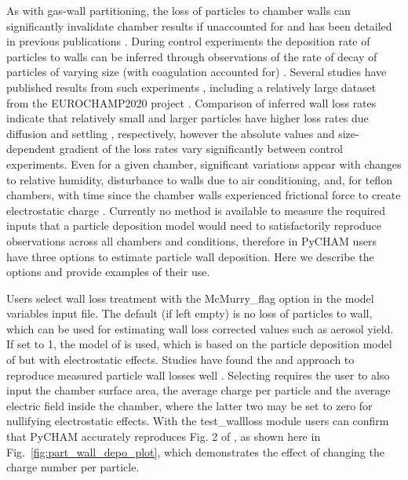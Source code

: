 \documentclass[gmd, manuscript]{copernicus}
\begin{document}
As with gas-wall partitioning, the loss of particles to chamber walls can significantly invalidate chamber results if unaccounted for and has been detailed in previous publications \citep{Crump1981, McMurry1985, Nah2017, Wang2018}.  During control experiments the deposition rate of particles to walls can be inferred through observations of the rate of decay of particles of varying size (with coagulation accounted for) \citep{Charan2019}.  Several studies have published results from such experiments \citep{McMurry1985, Wang2018}, including a relatively large dataset from the EUROCHAMP2020 project \citep{EUROCHAMP2020}.  Comparison of inferred wall loss rates indicate that relatively small and larger particles have higher loss rates due diffusion and settling \citep{Crump1981}, respectively, however the absolute values and size-dependent gradient of the loss rates vary significantly between control experiments.  Even for a given chamber, significant variations appear with changes to relative humidity, disturbance to walls due to air conditioning, and, for teflon chambers, with time since the chamber walls experienced frictional force to create electrostatic charge \citep{Wang2018}.  Currently no method is available to measure the required inputs that a particle deposition model would need to satisfactorily reproduce observations across all chambers and conditions, therefore in PyCHAM users have three options to estimate particle wall deposition.  Here we describe the options and provide examples of their use.

Users select wall loss treatment with the McMurry\_flag option in the model variables input file.  The default (if left empty) is no loss of particles to wall, which can be used for estimating wall loss corrected values such as aerosol yield.  If set to 1, the model of \citet{McMurry1985} is used, which is based on the particle deposition model of \citet{Crump1981} but with electrostatic effects.  Studies have found the \citet{Crump1981} and \citet{McMurry1985} approach to reproduce measured particle wall losses well \citep{Chen1992, Kim2001}.  Selecting \citet{McMurry1985} requires the user to also input the chamber surface area, the average charge per particle and the average electric field inside the chamber, where the latter two may be set to zero for nullifying electrostatic effects.  With the test\_wallloss module users can confirm that PyCHAM accurately reproduces Fig. 2 of \citet{McMurry1985}, as shown here in Fig.~\ref{fig:part_wall_depo_plot}, which demonstrates the effect of changing the charge number per particle.
\end{document}
